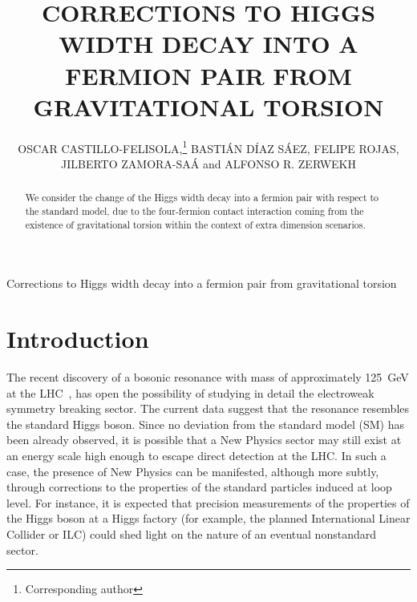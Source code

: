\documentclass{ws-mpla}
\renewcommand{\(}{\left(}
\renewcommand{\)}{\right)}
\renewcommand{\[}{\left[}
\renewcommand{\]}{\right]}
\newcommand\UTFSM{Departamento de F\'\i sica, Universidad T\'{e}cnica Federico Santa Mar\'\i a, \\ Casilla 110-V, Valpara\'\i so, Chile}
\newcommand\CCTVal{Centro Cient\'\i fico Tecnol\'ogico de Valpara\'\i so, \\ Casilla 110-V, Valpara\'\i so, Chile}
\begin{document}
{Corrections to Higgs width decay into a fermion pair from gravitational torsion}

\catchline{}{}{}{}{}


\title{CORRECTIONS TO HIGGS WIDTH DECAY INTO A FERMION PAIR FROM GRAVITATIONAL TORSION}

\author{OSCAR {CASTILLO-FELISOLA},\footnote{Corresponding author} \quad BASTI\'AN {D\'IAZ S\'AEZ}, \quad  FELIPE {ROJAS}, \\ JILBERTO {ZAMORA-SA\'A} and ALFONSO R. {ZERWEKH}}

\address{\UTFSM, and \\ \CCTVal. \\ o.castillo.felisola@gmail.com}

\maketitle



\begin{abstract}
  We consider the change of the Higgs width decay into a fermion pair  with respect to the standard model, due to the four-fermion contact interaction coming from the existence of gravitational torsion within the context of extra dimension scenarios.
\end{abstract}




\section{Introduction}\label{intro}


The recent discovery of a bosonic resonance with mass of approximately \SI{125}{\GeV} at the LHC~\cite{Aaltonen:2012qt,Aad:2012tfa,Chatrchyan:2012ufa,Aad:2015zhl}, has open the possibility of studying in detail the electroweak symmetry breaking sector. The current data suggest that the resonance resembles the standard Higgs boson.   Since no deviation from the standard model (SM) has been already observed, it is possible that a New Physics sector may still exist at an energy scale high enough to escape direct detection at the LHC. In such a case, the presence of New Physics can be manifested, although more subtly, through corrections to the properties of the standard particles induced at loop level. For instance, it is expected that  precision measurements of the properties of the Higgs boson at a Higgs factory (for example, the planned International Linear Collider or ILC) could shed light on the nature of an eventual nonstandard sector.
\end{document}
